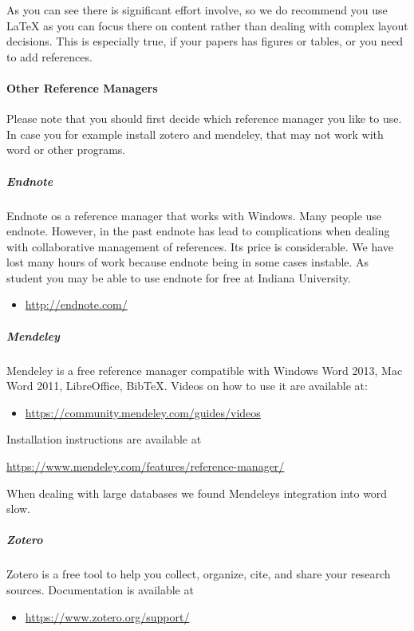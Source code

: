 As you can see there is significant effort involve, so we do recommend you
use LaTeX as you can focus there on content rather than dealing with
complex layout decisions. This is especially true, if your papers has
figures or tables, or you need to add references.


\paragraph{Other Reference Managers}
\label{\detokenize{lesson/doc/latex:other-reference-managers}}
Please note that you should first decide which reference manager you
like to use. In case you for example install zotero and mendeley, that
may not work with word or other programs.


\subparagraph{Endnote}
\label{\detokenize{lesson/doc/latex:endnote}}
Endnote os a reference manager that works with Windows. Many people
use endnote. However, in the past endnote has lead to complications
when dealing with collaborative management of references. Its price is
considerable. We have lost many hours of work because endnote being in
some cases instable. As student you may be able to use endnote for
free at Indiana University.
\begin{itemize}
\item {} 
\url{http://endnote.com/}

\end{itemize}


\subparagraph{Mendeley}
\label{\detokenize{lesson/doc/latex:mendeley}}
Mendeley is a free reference manager compatible with Windows Word 2013,
Mac Word 2011, LibreOffice, BibTeX. Videos on how to use it are
available at:
\begin{itemize}
\item {} 
\url{https://community.mendeley.com/guides/videos}

\end{itemize}

Installation instructions are available at

\url{https://www.mendeley.com/features/reference-manager/}

When dealing with large databases we found Mendeleys integration into
word slow.


\subparagraph{Zotero}
\label{\detokenize{lesson/doc/latex:zotero}}
Zotero is a free tool to help you collect, organize, cite, and share
your research sources.  Documentation is available at
\begin{itemize}
\item {} 
\url{https://www.zotero.org/support/}

\end{itemize}

